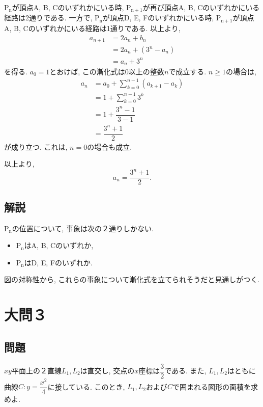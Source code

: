 \documentclass[dvipdfmx,a4paper]{jsarticle}
\begin{document}
    $\mathrm{P_n}$が頂点A, B, Cのいずれかにいる時, 
    $\mathrm{P_{n+1}}$が再び頂点A, B, Cのいずれかにいる経路は2通りである. 
    一方で, $\mathrm{P_n}$が頂点D, E, Fのいずれかにいる時, 
    $\mathrm{P_{n+1}}$が頂点A, B, Cのいずれかにいる経路は1通りである. 
    以上より, 
    \begin{align*}
        a_{n+1} &= 2a_n + b_n \\
                &= 2a_n + (3^n-a_n) \\
                &= a_n + 3^n
    \end{align*}
    を得る. $a_0=1$とおけば, この漸化式は0以上の整数$n$で成立する. 
    $n \geq 1$の場合は, 
    \begin{align*}\displaystyle
        a_n &= a_0 + \sum_{k=0}^{n-1} (a_{k+1} - a_k) \\
            &= 1 + \sum_{k=0}^{n-1} 3^k \\
            &= 1 + \dfrac{3^n-1}{3-1} \\
            &= \dfrac{3^n+1}{2}
    \end{align*}
    が成り立つ. これは, $n=0$の場合も成立. 

    以上より, 
    \begin{equation*}
        a_n = \dfrac{3^n+1}{2}.
    \end{equation*}
    

    \subsection{解説}
    $\mathrm{P_n}$の位置について, 事象は次の２通りしかない. 
    \begin{itemize}
        \item $\mathrm{P_n}$はA, B, Cのいずれか, 
        \item $\mathrm{P_n}$はD, E, Fのいずれか. 
    \end{itemize}
    図の対称性から, これらの事象について漸化式を立てられそうだと見通しがつく. 


    \section{大問３}
    \subsection{問題}
    $xy$平面上の２直線$L_1, L_2$は直交し, 交点の$x$座標は$\dfrac{3}{2}$である. また, 
    $L_1, L_2$はともに曲線$C: y = \dfrac{x^2}{4}$に接している. 
    このとき, $L_1, L_2$および$C$で囲まれる図形の面積を求めよ. 
\end{document}
